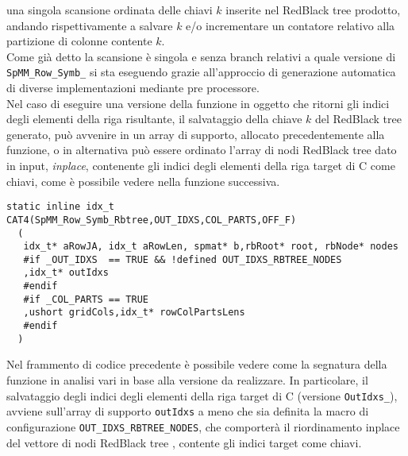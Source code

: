 una singola scansione ordinata delle chiavi $k$ inserite nel RedBlack tree prodotto, andando rispettivamente 
a salvare $k$ e/o incrementare un contatore relativo alla partizione di colonne contente $k$.\\
Come già detto la scansione è singola e senza branch relativi a quale versione di \verb|SpMM_Row_Symb_| si sta eseguendo grazie all'approccio
di generazione automatica di diverse implementazioni mediante pre processore.\\
\label{OUT_IDXS_RBTREE_NODES}
Nel caso di eseguire una versione della funzione in oggetto
 che ritorni gli indici degli elementi \nnz della riga risultante, %
 il salvataggio della chiave $k$ del RedBlack tree generato,
può avvenire in un array di supporto, allocato precedentemente alla funzione, o 
in alternativa può essere ordinato l'array di nodi RedBlack tree dato in input, \emph{inplace}, 
contenente gli indici degli elementi \nnz della riga target di C come chiavi,
come è possibile vedere nella funzione successiva.\\
\begin{lstlisting}
static inline idx_t CAT4(SpMM_Row_Symb_Rbtree,OUT_IDXS,COL_PARTS,OFF_F)
  (
   idx_t* aRowJA, idx_t aRowLen, spmat* b,rbRoot* root, rbNode* nodes
   #if _OUT_IDXS  == TRUE && !defined OUT_IDXS_RBTREE_NODES 
   ,idx_t* outIdxs
   #endif
   #if _COL_PARTS == TRUE
   ,ushort gridCols,idx_t* rowColPartsLens
   #endif
  )
\end{lstlisting}
Nel frammento di codice precedente è possibile vedere come la segnatura della funzione in analisi vari in base alla versione da realizzare.
In particolare, il salvataggio degli indici \nnz degli elementi della riga target di C (versione \verb|OutIdxs_|), avviene sull'array di supporto 
\verb|outIdxs| a meno che sia definita la macro di configurazione \verb|OUT_IDXS_RBTREE_NODES|, che comporterà il riordinamento inplace del vettore di 
nodi RedBlack tree , contente gli indici target come chiavi.\\


